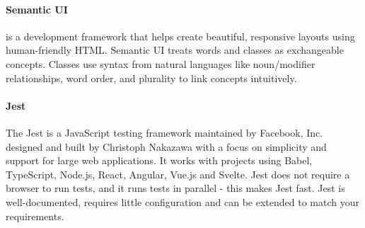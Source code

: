 \paragraph{Semantic UI} is a development framework that helps create beautiful, responsive layouts using human-friendly HTML.
Semantic UI treats words and classes as exchangeable concepts.
Classes use syntax from natural languages like noun/modifier relationships, word order, and plurality to link concepts intuitively.


\paragraph{Jest} 
The Jest is a JavaScript testing framework maintained by Facebook, Inc.
designed and built by Christoph Nakazawa with a focus on simplicity and support for large web applications.
It works with projects using Babel, TypeScript, Node.js, React, Angular, Vue.js and Svelte.
Jest does not require a browser to run tests, and it runs tests in parallel - this makes Jest fast.
Jest is well-documented, requires little configuration and can be extended to match your requirements.
